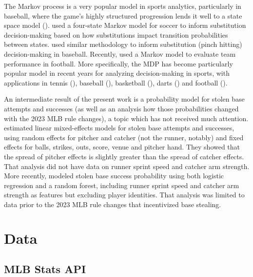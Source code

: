 \documentclass{article}
\begin{document}
    The Markov process is a very popular model in sports analytics, particularly in baseball, where the game's highly structured progression lends it well to a state space model (\cite{bukiet_markov_1997}). \textcite{hirotsu_using_2002} used a four-state Markov model for soccer to inform substitution decision-making based on how substitutions impact transition probabilities between states. \textcite{hirotsu_markov_2003} used similar methodology to inform substitution (pinch hitting) decision-making in baseball. Recently, \textcite{chan_points_2021} used a Markov model to evaluate team performance in football. More specifically, the MDP has become particularly popular model in recent years for analyzing decision-making in sports, with applications in tennis (\cite{nadimpalli_when_2013}), baseball (\cite{hirotsu_using_2019}), basketball (\cite{sandholtz_markov_2020}), darts (\cite{baird_optimising_2020}) and football (\cite{biro_reinforcement_2022}).

    An intermediate result of the present work is a probability model for stolen base attempts and successes (as well as an analysis how those probabilities changed with the 2023 MLB rule changes), a topic which has not received much attention. \textcite{loughin_assessing_2008} estimated linear mixed-effects models for stolen base attempts and successes, using random effects for pitcher and catcher (not the runner, notably) and fixed effects for balls, strikes, outs, score, venue and pitcher hand. They showed that the spread of pitcher effects is slightly greater than the spread of catcher effects. That analysis did not have data on runner sprint speed and catcher arm strength. More recently, \textcite{stanley_modeling_2023} modeled stolen base success probability using both logistic regression and a random forest, including runner sprint speed and catcher arm strength as features but excluding player identities. That analysis was limited to data prior to the 2023 MLB rule changes that incentivized base stealing.

  \section{Data}

    \subsection{MLB Stats API}
    \label{sec:statsapi}
\end{document}
